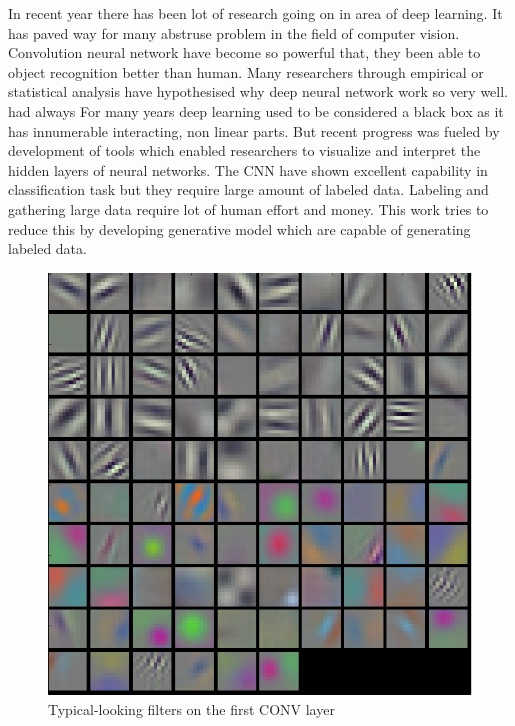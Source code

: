 


In recent year there has been lot of research going on in area of deep learning. It has paved way for many abstruse problem in the field of computer vision. Convolution neural network have become so powerful that, they been able to object recognition better than human\cite{CNN-Better,krizhevsky2012imagenet,szegedy2015going,he2016deep,simonyan2014very}. Many researchers\cite{1608.08225} through empirical or statistical analysis have hypothesised why deep neural network work so very well.  had always  For many years deep learning used to be considered a black box as it has innumerable interacting, non linear parts. But recent progress was fueled by development of tools \cite{tensorflow2015-whitepaper} which enabled researchers to visualize and interpret the hidden layers of neural networks\cite{1506.06579}.
The CNN have shown excellent capability in classification task\cite{CNN-Better} but they require large amount of labeled data. Labeling and gathering large data require lot of human effort and money. This work tries to reduce this by developing generative model which are capable of generating labeled data.

\begin{figure}[H]
  \centering
    \includegraphics[scale=.3, angle=0]{Files/cnn_visaulize.jpeg}
    \caption[Typical-looking filters on the first CONV layer of a imagenet]{Typical-looking filters on the first CONV layer}
    \label{fig:visualize-cnn}
\end{figure}


